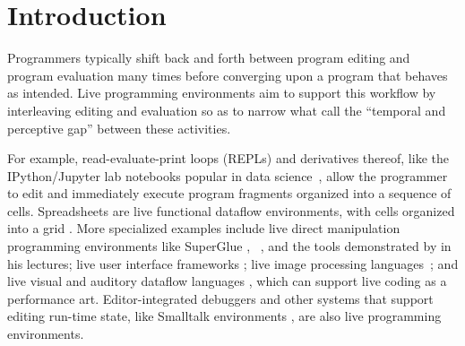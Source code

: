 \vspace{-5px}
\newcommand{\introSec}{Introduction}
\section{\protect\introSec} %
\label{sec:intro}


Programmers typically shift back and forth between program editing and program evaluation many times before converging upon a program that behaves as intended. 
Live programming environments aim to support this workflow by interleaving editing and evaluation so as to   
narrow what \citet{burckhardt2013s} call the ``temporal and perceptive gap'' between these activities.

For example, read-evaluate-print loops (REPLs) and derivatives thereof, like the IPython/Jupyter lab notebooks popular in data science~\cite{PER-GRA:2007}, allow the programmer to edit and immediately execute program fragments organized into a sequence of cells. 
Spreadsheets are live functional dataflow environments, with cells organized into a grid \cite{DBLP:journals/jfp/Wakeling07}. 
More specialized examples include live direct manipulation programming environments like SuperGlue
\cite{McDirmid:2007}, \sns{}~\cite{sns-pldi,sns-uist}, and the tools
demonstrated by \citet{victor2012inventing} in his lectures;
%
live user interface frameworks \cite{burckhardt2013s};
%
live image processing languages~\cite{DBLP:journals/vlc/Tanimoto90};
%
and live visual and auditory dataflow languages \cite{DBLP:conf/vl/BurnettAW98}, which can support live coding as a performance art.
Editor-integrated debuggers \cite{mccauley2008debugging} and other systems that support editing run-time state, like Smalltalk environments \cite{Goldberg:1983cn}, are also live programming environments. 

